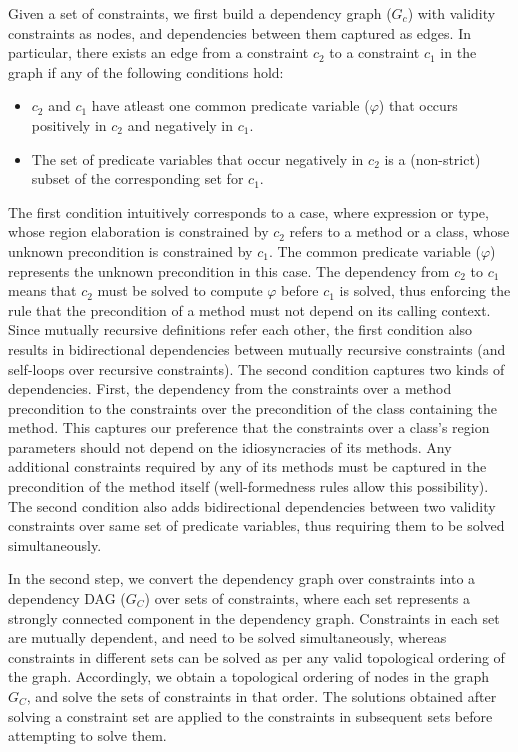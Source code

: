 Given a set of constraints, we first build a dependency graph ($G_c$)
with validity constraints as nodes, and dependencies between them
captured as edges. In particular, there exists an edge from a
constraint $c_2$ to a constraint $c_1$ in the graph if any of the
following conditions hold:
\begin{itemize}
\item $c_2$ and $c_1$ have atleast one common predicate variable
($\varphi$) that occurs positively in $c_2$ and negatively in $c_1$.
\item The set of predicate variables that occur negatively in $c_2$ is
a (non-strict) subset of the corresponding set for $c_1$.
\end{itemize}
The first condition intuitively corresponds to a case, where
expression or type, whose region elaboration is constrained by $c_2$
refers to a method or a class, whose unknown precondition is
constrained by $c_1$. The common predicate variable ($\varphi$)
represents the unknown precondition in this case. The dependency from
$c_2$ to $c_1$ means that $c_2$ must be solved to compute $\varphi$
before $c_1$ is solved, thus enforcing the rule that the precondition
of a method must not depend on its calling context. Since mutually
recursive definitions refer each other, the first condition also
results in bidirectional dependencies between mutually recursive
constraints (and self-loops over recursive constraints). The second
condition captures two kinds of dependencies. First, the dependency
from the constraints over a method precondition to the constraints
over the precondition of the class containing the method. This
captures our preference that the constraints over a class's region
parameters should not depend on the idiosyncracies of its methods. Any
additional constraints required by any of its methods must be captured
in the precondition of the method itself (well-formedness rules allow
this possibility). The second condition also adds bidirectional
dependencies between two validity constraints over same set of
predicate variables, thus requiring them to be solved simultaneously. 

In the second step, we convert the dependency graph over constraints
into a dependency DAG ($G_C$) over sets of constraints, where each set
represents a strongly connected component in the dependency graph.
Constraints in each set are mutually dependent, and need to be solved
simultaneously, whereas constraints in different sets can be solved as
per any valid topological ordering of the graph. Accordingly, we
obtain a topological ordering of nodes in the graph $G_{{C}}$, and
solve the sets of constraints in that order. The solutions obtained
after solving a constraint set are applied to the constraints in
subsequent sets before attempting to solve them. 

